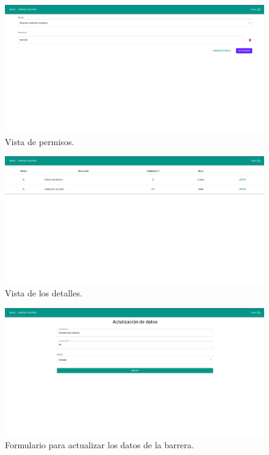 \begin{figure}[bth]
    \centering
    \includegraphics[width=\textwidth]{imgs/server/in-type.png}
    \caption{Vista de permisos.}
    \label{fig:in-type}
\end{figure}
\begin{figure}[bth]
    \centering
    \includegraphics[width=\textwidth]{imgs/server/client-barriers-details.png}
    \caption{Vista de los detalles.}
    \label{fig:barrier-details}
\end{figure}

\begin{figure}[bth]
    \centering
    \includegraphics[width=\textwidth]{imgs/server/barrier-update-data.png}
    \caption{Formulario para actualizar los datos de la barrera.}
    \label{fig:update-barrier}
\end{figure}


